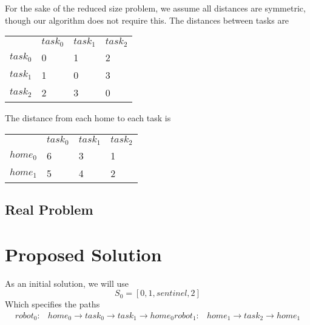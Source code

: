\documentclass[a4paper]{article}
\begin{document}
For the sake of the reduced size problem, we assume all distances are symmetric, though our algorithm does not require this. The distances between tasks are

\begin{tabular}{llll}
                   & $\mathit{task}_0$ & $\mathit{task}_1$ & $\mathit{task}_2$ \\
$\mathit{task}_0$  & 0                 & 1                 & 2                 \\
$\mathit{task}_1$  & 1                 & 0                 & 3                 \\
$\mathit{task}_2$  & 2                 & 3                 & 0                 \\
\end{tabular}
\vspace{1.5em}

The distance from each home to each task is

\begin{tabular}{llll}
                   & $\mathit{task}_0$ & $\mathit{task}_1$ & $\mathit{task}_2$ \\
$\mathit{home}_0$ & 6                 & 3                 & 1                  \\
$\mathit{home}_1$ & 5                 & 4                 & 2                  \\
\end{tabular}
\vspace{1.5em}

\subsection{Real Problem}



\section{Proposed Solution}

As an initial solution, we will use
$$S_0 = [0, 1, \mathit{sentinel}, 2 ]$$
Which specifies the paths
\begin{align*}
\mathit{robot}_0: & \mathit{home}_0 \rightarrow \mathit{task}_0 \rightarrow \mathit{task}_1 \rightarrow  \mathit{home}_0
\mathit{robot}_1: & \mathit{home}_1 \rightarrow \mathit{task}_2 \rightarrow \mathit{home}_1
\end{align*}
\end{document}
